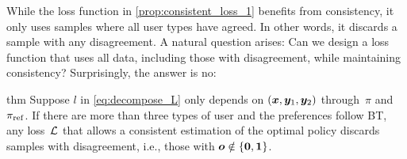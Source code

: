 While the loss function in \cref{prop:consistent_loss_1} benefits from consistency, it only uses samples where all user types have agreed. In other words, it discards a sample with any disagreement. A natural question arises: Can we design a loss function that uses all data, including those with disagreement, while maintaining consistency? Surprisingly, the answer is no:
\begin{theoremEnd}[restate]{thm}
\label{thm:no_good_consistent_loss}
Suppose $l$ in \cref{eq:decompose_L} only depends on $({\bm{x}}, {\bm{y}}_1, {\bm{y}}_2)$ through~$\pi$ and~$\pi_{\rm ref}$. If there are more than three types of user and the preferences follow BT, any loss~${\mathcal{L}}$ that allows a consistent estimation of the optimal policy discards samples with disagreement, i.e., those with ${\bm{o}} \notin \{{\bm{0}}, {\bm{1}}\}$.
\end{theoremEnd}
